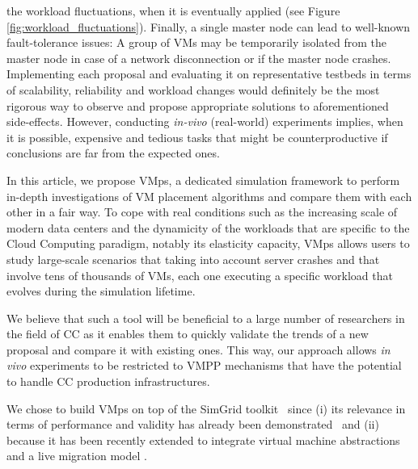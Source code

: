 \documentclass[conference]{IEEEtran}
\newcommand{\sg}{SimGrid\xspace}
\newcommand{\vmps}{VMps\xspace}
\begin{document}
the workload fluctuations, when it is eventually applied (see Figure
\ref{fig:workload_fluctuations}). Finally, a single master node can
lead to well-known fault-tolerance issues: A group of VMs may be
temporarily isolated from the master node in case of a network
disconnection or if the master node crashes.
%
Implementing each proposal and evaluating it on representative
testbeds in terms of scalability, reliability and workload changes
would definitely be the most rigorous way to observe and propose
appropriate solutions to aforementioned
side-effects.
 However, conducting \textit{in-vivo}
 (\ie real-world)
experiments implies,
when it is possible, expensive and tedious tasks that might be
counterproductive if conclusions are far from the expected ones.
%

In this article, we propose %
\vmps, a dedicated simulation framework to perform in-depth
investigations of VM placement algorithms and compare them with each
other in a fair way. To cope with real conditions such as the
increasing scale of modern data centers and the dynamicity of the
workloads that are specific to the Cloud Computing paradigm, notably
its elasticity capacity, \vmps allows users to study large-scale
scenarios that taking into account server crashes and that involve
tens of thousands of VMs, each one executing a specific workload that
evolves during the simulation lifetime.

We believe that such a tool will be beneficial to a large number of
researchers in the field of CC as it enables them to quickly validate
the trends of a new proposal and compare it with existing
ones. This way, our approach allows \textit{in vivo} experiments to be
restricted to VMPP mechanisms that have the potential to handle CC
production infrastructures.

%
We chose to build \vmps on top of the \sg
toolkit~\cite{casanova:hal-01017319} since (i) its relevance in terms
of performance and validity has already been
demonstrated~\cite{simgridpub} and (ii) because it has been recently
extended to integrate virtual machine abstractions and a live
migration model \cite{Hirofuchi:2013:ALM:2568486.2568524}.
\end{document}
